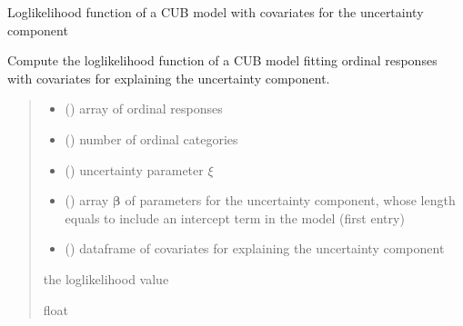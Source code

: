 \documentclass[letterpaper,10pt,english]{sphinxmanual}
\begin{document}

\begin{fulllineitems}
\label{\detokenize{cubmods:cubmods.cub_y0.loglik}}
\pysigstartsignatures
{}
\pysigstopsignatures
\sphinxAtStartPar
Log\sphinxhyphen{}likelihood function of a CUB model with covariates for the uncertainty component

\sphinxAtStartPar
Compute the log\sphinxhyphen{}likelihood function of a CUB model fitting ordinal responses with covariates 
for explaining the uncertainty component.
\begin{quote}\begin{description}
\begin{itemize}
\item {} 
\sphinxAtStartPar
{} () \textendash{} array of ordinal responses

\item {} 
\sphinxAtStartPar
{} () \textendash{} number of ordinal categories

\item {} 
\sphinxAtStartPar
{} () \textendash{} uncertainty parameter \(\xi\)

\item {} 
\sphinxAtStartPar
{} () \textendash{} array \(\pmb \beta\) of parameters for the uncertainty component, whose length equals 
 to include an intercept term in the model (first entry)

\item {} 
\sphinxAtStartPar
{} () \textendash{} dataframe of covariates for explaining the uncertainty component

\end{itemize}

\sphinxAtStartPar
the log\sphinxhyphen{}likelihood value

\sphinxAtStartPar
float

\end{description}\end{quote}

\end{fulllineitems}
\end{document}

